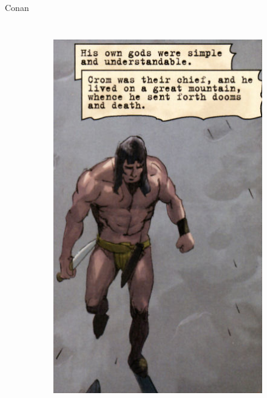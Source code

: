 \begin{frame}{Conan}
\begin{columns}
\begin{figure}[htp]
\begin{subfigure}[b]{0.27\textwidth}
				\includegraphics[width=\textwidth]{img/conan/DH}
			\end{subfigure}
			~
			\begin{subfigure}[b]{0.23\textwidth}

\end{subfigure}
\end{figure}
\end{columns}
\end{frame}
